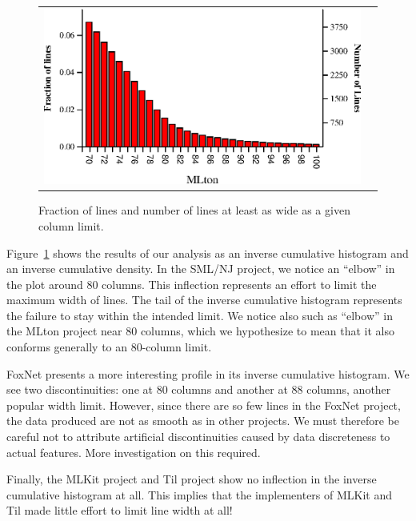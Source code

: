 \documentclass[12pt,abstracton]{scrartcl}
\begin{document}
\begin{figure}[h!]
\begin{tabular}{cc}
\includegraphics[scale=0.68]{mlton.eps} &
\end{tabular}
\caption{Fraction of lines and number of lines at least as wide as a given column limit.}
\label{fig:width}
\end{figure}

Figure~\ref{fig:width} shows the results of our analysis
as an inverse cumulative histogram and an inverse cumulative density. In the SML/NJ project,
we notice an ``elbow'' in the plot around 80 columns. This inflection represents
an effort to limit the maximum width of lines. The tail of the inverse cumulative
histogram represents the failure to stay within the intended limit. We notice
also such as ``elbow'' in the MLton project near 80 columns, which we hypothesize
to mean that it also conforms generally to an 80-column limit.

FoxNet presents a more interesting profile in its inverse cumulative histogram. We see
two discontinuities: one at 80 columns and another at 88 columns, another popular width limit.
However, since there are so few lines in the FoxNet project, the data produced are
not as smooth as in other projects. We must therefore be careful not to attribute
artificial discontinuities caused by data discreteness to actual features. More
investigation on this required.

Finally, the MLKit project and Til project show no inflection in the
inverse cumulative histogram at all. This implies that the implementers of MLKit
and Til made little effort to limit line width at all!
\end{document}

